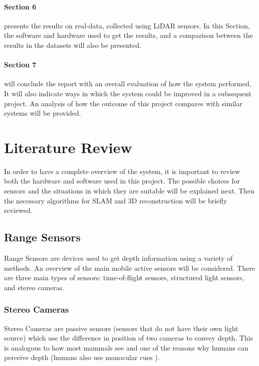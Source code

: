 \documentclass[11pt]{article}
\begin{document}
\paragraph{Section 6} presents the results on real-data, collected using LiDAR sensors. In this Section, the software and hardware used to get the results, and a comparison between the results in the datasets will also be presented.
		
\paragraph{Section 7} will conclude the report with an overall evaluation of how the system performed. It will also indicate ways in which the system could be improved in a subsequent project. An analysis of how the outcome of this project compares with similar systems will be provided.

	\newpage
	\section{Literature Review}

In order to have a complete overview of the system, it is important to review both the hardware and software used in this project. The possible choices for sensors and the situations in which they are suitable will be explained next. Then the necessary algorithms for SLAM and 3D reconstruction will be briefly reviewed.

	\subsection{Range Sensors}
	\label{subs:RangeSensors}
	
Range Sensors are devices used to get depth information using a variety of methods. An overview of the main mobile active sensors will be considered. There are three main types of sensors: time-of-flight sensors, structured light sensors, and stereo cameras.

	\subsubsection{Stereo Cameras}
	
Stereo Cameras are passive sensors (sensors that do not have their own light source) which use the difference in position of two cameras to convey depth. This is analogous to how most mammals see and one of the reasons why humans can perceive depth (humans also use monocular cues \cite{goldstein2016sensation}).
\end{document}
